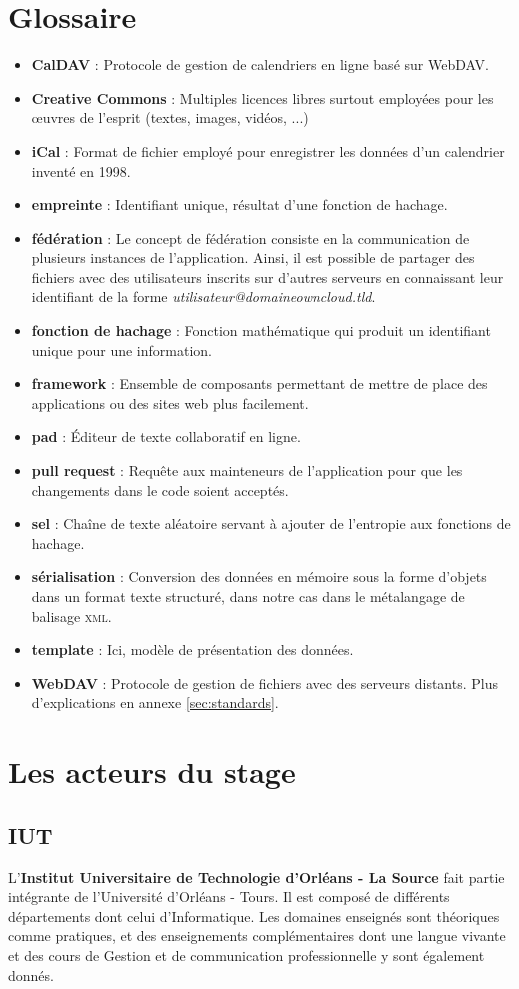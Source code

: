 \documentclass[10pt,a4paper, twoside]{report}
\newcommand{\mychapter}[2]{
	\setcounter{chapter}{#1}
	\setcounter{section}{0}
	\chapter*{#2}
	\addcontentsline{toc}{chapter}{#2}
}
\begin{document}
	\mychapter{0}{Glossaire}
	\begin{itemize}
		\item \textbf{CalDAV} : Protocole de gestion de calendriers en ligne basé sur WebDAV.
		\item \textbf{Creative Commons} : Multiples licences libres surtout employées pour les œuvres de l'esprit (textes, images, vidéos, ...)
		\item \textbf{iCal} : Format de fichier employé pour enregistrer les données d'un calendrier inventé en 1998.
		\item \textbf{empreinte} : Identifiant unique, résultat d'une fonction de hachage.
		\item \textbf{fédération} : Le concept de fédération consiste en la communication de plusieurs instances de l'application. Ainsi, il est possible de partager des fichiers avec des utilisateurs inscrits sur d'autres serveurs en connaissant leur identifiant de la forme \textit{utilisateur@domaineowncloud.tld}.
		\item \textbf{fonction de hachage} : Fonction mathématique qui produit un identifiant unique pour une information.
		\item \textbf{framework} : Ensemble de composants permettant de mettre de place des applications ou des sites web plus facilement.
		\item \textbf{pad} : Éditeur de texte collaboratif en ligne.
		\item \textbf{pull request} : Requête aux mainteneurs de l'application pour que les changements dans le code soient acceptés.
		\item \textbf{sel} : Chaîne de texte aléatoire servant à ajouter de l'entropie aux fonctions de hachage.
		\item \textbf{sérialisation} : Conversion des données en mémoire sous la forme d'objets dans un format texte structuré, dans notre cas dans le métalangage de balisage \textsc{xml}.
		\item \textbf{template} : Ici, modèle de présentation des données.
		\item \textbf{WebDAV} : Protocole de gestion de fichiers avec des serveurs distants. Plus d'explications en annexe \ref{sec:standards}.
	\end{itemize}
	\thispagestyle{empty}
	\newpage\null\thispagestyle{empty}\newpage
	\chapter{Les acteurs du stage}
	\section{IUT}
	L'\textbf{Institut Universitaire de Technologie d'Orléans - La Source} fait partie intégrante de l'Université d'Orléans - Tours. Il est composé de différents départements dont celui d'Informatique. Les domaines enseignés sont théoriques comme pratiques, et des enseignements complémentaires dont une langue vivante et des cours de Gestion et de communication professionnelle y sont également donnés.
	
\end{document}
